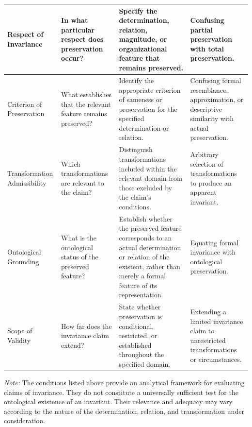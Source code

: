 \begin{table}[htbp]
\begin{tabular}{
        p{2.7cm}
        p{3.4cm}
        p{4.0cm}
        p{3.1cm}
    }
        Respect of Invariance
        &
        In what particular respect does preservation occur?
        &
        Specify the determination, relation, magnitude, or organizational
        feature that remains preserved.
        &
        Confusing partial preservation with total preservation.
        \\
        \hline

        Criterion of Preservation
        &
        What establishes that the relevant feature remains preserved?
        &
        Identify the appropriate criterion of sameness or preservation
        for the specified determination or relation.
        &
        Confusing formal resemblance, approximation, or descriptive
        similarity with actual preservation.
        \\
        \hline

        Transformation Admissibility
        &
        Which transformations are relevant to the claim?
        &
        Distinguish transformations included within the relevant
        domain from those excluded by the claim's conditions.
        &
        Arbitrary selection of transformations to produce an apparent
        invariant.
        \\
        \hline

        Ontological Grounding
        &
        What is the ontological status of the preserved feature?
        &
        Establish whether the preserved feature corresponds to an
        actual determination or relation of the existent, rather
        than merely a formal feature of its representation.
        &
        Equating formal invariance with ontological preservation.
        \\
        \hline

        Scope of Validity
        &
        How far does the invariance claim extend?
        &
        State whether preservation is conditional, restricted,
        or established throughout the specified domain.
        &
        Extending a limited invariance claim to unrestricted
        transformations or circumstances.
        \\
        \hline

    \end{tabular}

    \vspace{0.6em}

    \begin{minipage}{0.95\textwidth}
        \footnotesize
        \textit{Note:}
        The conditions listed above provide an analytical framework
        for evaluating claims of invariance. They do not constitute
        a universally sufficient test for the ontological existence
        of an invariant. Their relevance and adequacy may vary
        according to the nature of the determination, relation,
        and transformation under consideration.


\end{minipage}
\end{table}

